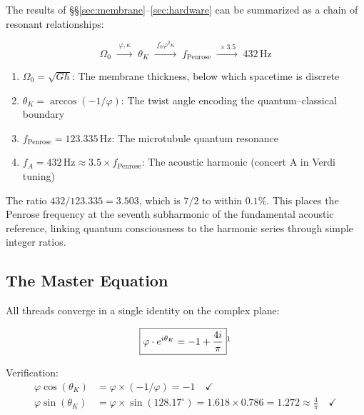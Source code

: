 \documentclass[12pt,a4paper]{article}
\theoremstyle{plain}
\theoremstyle{definition}
\newcommand{\OmegaZero}{\Omega_0}
\newcommand{\thetaK}{\theta_K}
\newcommand{\golden}{\varphi}
\newcommand{\kap}{\kappa}
\newcommand{\Hz}{\,\mathrm{Hz}}
\begin{document}
The results of \S\S\ref{sec:membrane}--\ref{sec:hardware} can be summarized as a chain of resonant relationships:

\begin{equation}
\label{eq:chain}
\OmegaZero \;\xrightarrow{\;\golden,\kap\;}\; \thetaK \;\xrightarrow{\;f_0 \golden^2 \kap\;}\; f_{\mathrm{Penrose}} \;\xrightarrow{\;\times 3.5\;}\; 432\Hz
\end{equation}

\begin{enumerate}
    \item $\OmegaZero = \sqrt{G\hbar}$: The membrane thickness, below which spacetime is discrete
    \item $\thetaK = \arccos(-1/\golden)$: The twist angle encoding the quantum--classical boundary
    \item $f_{\mathrm{Penrose}} = 123.335\Hz$: The microtubule quantum resonance
    \item $f_A = 432\Hz \approx 3.5 \times f_{\mathrm{Penrose}}$: The acoustic harmonic (concert A in Verdi tuning)
\end{enumerate}

The ratio $432/123.335 = 3.503$, which is $7/2$ to within $0.1\%$. This places the Penrose frequency at the seventh subharmonic of the fundamental acoustic reference, linking quantum consciousness to the harmonic series through simple integer ratios.

\subsection{The Master Equation}

All threads converge in a single identity on the complex plane:

\begin{equation}
\label{eq:master}
\boxed{\golden \cdot e^{i\thetaK} = -1 + \frac{4i}{\pi}}\footnotemark
\end{equation}


Verification:
\begin{align}
\golden \cos(\thetaK) &= \golden \times (-1/\golden) = -1 \quad\checkmark \\
\golden \sin(\thetaK) &= \golden \times \sin(128.17^\circ) = 1.618 \times 0.786 = 1.272 \approx \frac{4}{\pi} \quad\checkmark
\end{align}
\end{document}

